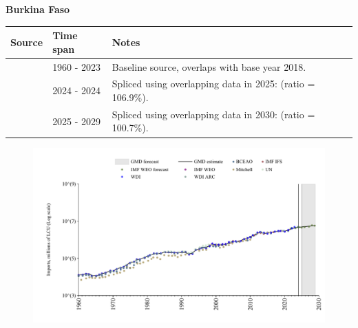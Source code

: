 \documentclass[12pt,a4paper,landscape]{article}
\begin{document}
\begin{adjustbox}{max totalsize={\paperwidth}{\paperheight},center}
\begin{minipage}[t][\textheight][t]{\textwidth}
\vspace*{0.5cm}
{}
\begin{center}
{\Large\bfseries Burkina Faso}
\end{center}
\vspace{0.5cm}
\begin{table}[H]
\centering
\small
\begin{tabular}{|l|l|l|}
\hline
\textbf{Source} & \textbf{Time span} & \textbf{Notes} \\
\hline
\rowcolor{white}\cite{WDI}& 1960 - 2023 &Baseline source, overlaps with base year 2018.\\
\rowcolor{lightgray}\cite{BCEAO}& 2024 - 2024 &Spliced using overlapping data in 2025: (ratio = 106.9\%).\\
\rowcolor{white}\cite{IMF_WEO_forecast}& 2025 - 2029 &Spliced using overlapping data in 2030: (ratio = 100.7\%).\\
\hline
\end{tabular}
\end{table}
\begin{figure}[H]
\centering
\includegraphics[width=\textwidth,height=0.6\textheight,keepaspectratio]{graphs/BFA_imports.pdf}
\end{figure}
\end{minipage}
\end{adjustbox}
\end{document}
